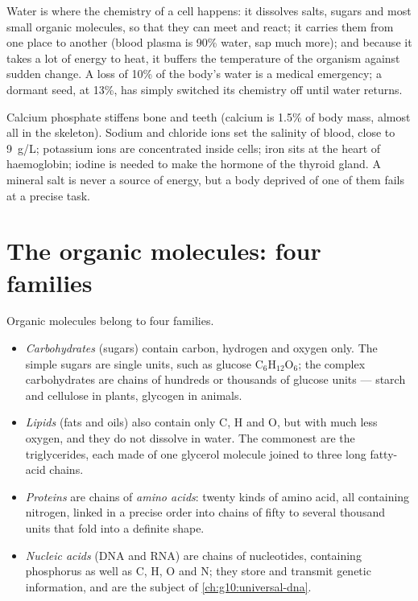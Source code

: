 \begin{proposition}\label{prop:g10:chemistry-of-life:water-roles}
Water is where the chemistry of a cell happens: it dissolves salts,
sugars and most small organic molecules, so that they can meet and
react; it carries them from one place to another (blood plasma is 90\%
water, sap much more); and because it takes a lot of energy to heat,
it buffers the temperature of the organism against sudden change. A
loss of 10\% of the body's water is a medical emergency; a dormant
seed, at 13\%, has simply switched its chemistry off until water
returns.
\end{proposition}
\admitted

\begin{example}\label{ex:g10:chemistry-of-life:salts}
Calcium phosphate stiffens bone and teeth (calcium is 1.5\% of body
mass, almost all in the skeleton). Sodium and chloride ions set the
salinity of blood, close to \qty{9}{g/L}; potassium ions are
concentrated inside cells; iron sits at the heart of haemoglobin;
iodine is needed to make the hormone of the thyroid gland. A mineral
salt is never a source of energy, but a body deprived of one of them
fails at a precise task.
\end{example}

\section{The organic molecules: four families}

\begin{definition}\label{def:g10:chemistry-of-life:families}
Organic molecules belong to four families.
\begin{itemize}
  \item \emph{Carbohydrates} (sugars) contain
        carbon, hydrogen and oxygen only. The simple sugars are single
        units, such as glucose $\mathrm{C_6H_{12}O_6}$; the complex
        carbohydrates are chains of hundreds or thousands of glucose
        units --- starch and cellulose in plants, glycogen in animals.
  \item \emph{Lipids} (fats and oils) also contain only
        C, H and O, but with much less oxygen, and they do not dissolve
        in water. The commonest are the triglycerides, each made of one
        glycerol molecule joined to three long fatty-acid chains.
  \item \emph{Proteins} are chains of
        \emph{amino acids}: twenty kinds of amino
        acid, all containing nitrogen, linked in a precise order into
        chains of fifty to several thousand units that fold into a
        definite shape.
  \item \emph{Nucleic acids} (DNA and RNA) are
        chains of nucleotides, containing phosphorus as well as C, H,
        O and N; they store and transmit genetic information, and are
        the subject of \cref{ch:g10:universal-dna}.
\end{itemize}
\end{definition}

